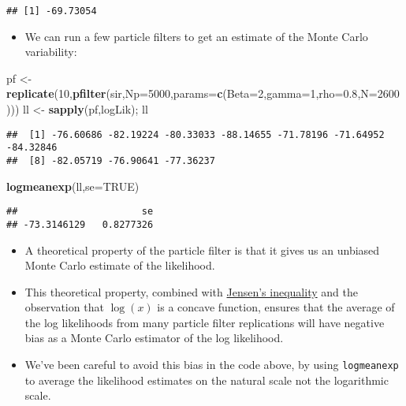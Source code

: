 \documentclass[]{article}
\newenvironment{Shaded}{\begin{snugshade}}{\end{snugshade}}
\newcommand{\KeywordTok}[1]{\textcolor[rgb]{0.13,0.29,0.53}{\textbf{#1}}}
\newcommand{\DataTypeTok}[1]{\textcolor[rgb]{0.13,0.29,0.53}{#1}}
\newcommand{\DecValTok}[1]{\textcolor[rgb]{0.00,0.00,0.81}{#1}}
\newcommand{\FloatTok}[1]{\textcolor[rgb]{0.00,0.00,0.81}{#1}}
\newcommand{\StringTok}[1]{\textcolor[rgb]{0.31,0.60,0.02}{#1}}
\newcommand{\OtherTok}[1]{\textcolor[rgb]{0.56,0.35,0.01}{#1}}
\newcommand{\NormalTok}[1]{#1}
\providecommand{\tightlist}{%
  \setlength{\itemsep}{0pt}\setlength{\parskip}{0pt}}
\begin{document}
\begin{verbatim}
## [1] -69.73054
\end{verbatim}

\begin{itemize}
\tightlist
\item
  We can run a few particle filters to get an estimate of the Monte
  Carlo variability:
\end{itemize}

\begin{Shaded}
\begin{Highlighting}[]
\NormalTok{pf <-}\StringTok{ }\KeywordTok{replicate}\NormalTok{(}\DecValTok{10}\NormalTok{,}\KeywordTok{pfilter}\NormalTok{(sir,}\DataTypeTok{Np=}\DecValTok{5000}\NormalTok{,}\DataTypeTok{params=}\KeywordTok{c}\NormalTok{(}\DataTypeTok{Beta=}\DecValTok{2}\NormalTok{,}\DataTypeTok{gamma=}\DecValTok{1}\NormalTok{,}\DataTypeTok{rho=}\FloatTok{0.8}\NormalTok{,}\DataTypeTok{N=}\DecValTok{2600}\NormalTok{)))}
\NormalTok{ll <-}\StringTok{ }\KeywordTok{sapply}\NormalTok{(pf,logLik); ll}
\end{Highlighting}
\end{Shaded}

\begin{verbatim}
##  [1] -76.60686 -82.19224 -80.33033 -88.14655 -71.78196 -71.64952 -84.32846
##  [8] -82.05719 -76.90641 -77.36237
\end{verbatim}

\begin{Shaded}
\begin{Highlighting}[]
\KeywordTok{logmeanexp}\NormalTok{(ll,}\DataTypeTok{se=}\OtherTok{TRUE}\NormalTok{)}
\end{Highlighting}
\end{Shaded}

\begin{verbatim}
##                      se 
## -73.3146129   0.8277326
\end{verbatim}

\begin{itemize}
\item
  A theoretical property of the particle filter is that it gives us an
  unbiased Monte Carlo estimate of the likelihood.
\item
  This theoretical property, combined with
  \href{https://en.wikipedia.org/wiki/Jensen\%27s_inequality}{Jensen's
  inequality} and the observation that \(\log(x)\) is a concave
  function, ensures that the average of the log likelihoods from many
  particle filter replications will have negative bias as a Monte Carlo
  estimator of the log likelihood.
\item
  We've been careful to avoid this bias in the code above, by using
  \texttt{logmeanexp} to average the likelihood estimates on the natural
  scale not the logarithmic scale.
\end{itemize}
\end{document}
